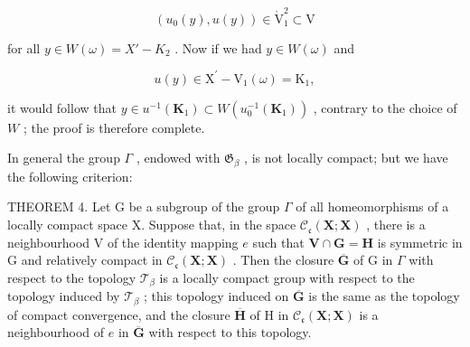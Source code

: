 \[
(u _ {0} (y), u (y)) \in \mathring {\mathrm{V}} _ {1} ^ {2} \subset \mathrm{V}
\]

for all \(y \in W(\omega) = X' - K_2\) . Now if we had \(y \in W(\omega)\) and

\[
u (y) \in \mathrm{X} ^ {\prime} - \mathrm{V} _ {1} (\omega) = \mathrm{K} _ {1},
\]

it would follow that \(y \in u^{-1}(\mathbf{K}_1) \subset W(u_0^{-1}(\mathbf{K}_1))\) , contrary to the choice of \(W\) ; the proof is therefore complete.

In general the group \(\Gamma\) , endowed with \(\mathfrak{G}_{\beta}\) , is not locally compact; but we have the following criterion:

THEOREM 4. Let G be a subgroup of the group \(\Gamma\) of all homeomorphisms of a locally compact space X. Suppose that, in the space \(\mathcal{C}_{\mathfrak{c}}(\mathbf{X};\mathbf{X})\) , there is a neighbourhood V of the identity mapping \(e\) such that \(\mathbf{V}\cap \mathbf{G} = \mathbf{H}\) is symmetric in G and relatively compact in \(\mathcal{C}_{\mathfrak{c}}(\mathbf{X};\mathbf{X})\) . Then the closure \(\overline{\mathbf{G}}\) of G in \(\Gamma\) with respect to the topology \(\mathcal{T}_{\beta}\) is a locally compact group with respect to the topology induced by \(\mathcal{T}_{\beta}\) ; this topology induced on \(\overline{\mathbf{G}}\) is the same as the topology of compact convergence, and the closure \(\overline{\mathbf{H}}\) of H in \(\mathcal{C}_{\mathfrak{c}}(\mathbf{X};\mathbf{X})\) is a neighbourhood of \(e\) in \(\overline{\mathbf{G}}\) with respect to this topology.


